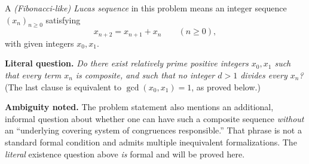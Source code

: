 A \emph{(Fibonacci-like) Lucas sequence} in this problem means an integer sequence $(x_n)_{n\ge 0}$ satisfying
\[
x_{n+2}=x_{n+1}+x_n \qquad(n\ge 0),
\]
with given integers $x_0,x_1$.

\medskip
\noindent\textbf{Literal question.}
\emph{Do there exist relatively prime positive integers $x_0,x_1$ such that every term $x_n$ is composite, and such that no integer $d>1$ divides every $x_n$?}
(The last clause is equivalent to $\gcd(x_0,x_1)=1$, as proved below.)

\medskip
\noindent\textbf{Ambiguity noted.}
The problem statement also mentions an additional, informal question about whether one can have such a composite sequence \emph{without} an ``underlying covering system of congruences responsible.''  That phrase is not a standard formal condition and admits multiple inequivalent formalizations.  The \emph{literal} existence question above \emph{is} formal and will be proved here.
